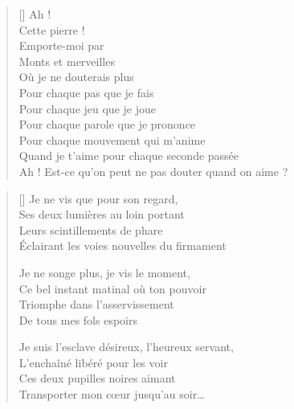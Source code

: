 \settowidth{\versewidth}{Ah ! Est-ce qu'on peut ne pas douter quand on aime ?}
\begin{verse}[\versewidth]
Ah ! \\
Cette pierre ! \\
Emporte-moi par \\
Monts et merveilles \\
Où je ne douterais plus \\
Pour chaque pas que je fais \\
Pour chaque jeu que je joue \\
Pour chaque parole que je prononce \\
Pour chaque mouvement qui m'anime \\
Quand je t'aime pour chaque seconde passée \\
Ah ! Est-ce qu'on peut ne pas douter quand on aime ?
\end{verse}


\settowidth{\versewidth}{Je suis l'esclave désireux, l'heureux servant,}
\begin{verse}[\versewidth]
Je ne vis que pour son regard, \\
Ses deux lumières au loin portant \\
Leurs scintillements de phare \\
Éclairant les voies nouvelles du firmament

Je ne songe plus, je vis le moment, \\
Ce bel instant matinal où ton pouvoir \\
Triomphe dans l'asservissement \\
De tous mes fols espoirs

Je suis l'esclave désireux, l'heureux servant, \\
L'enchaîné libéré pour les voir \\
Ces deux pupilles noires aimant \\
Transporter mon cœur jusqu'au soir…
\end{verse}

\newpage

